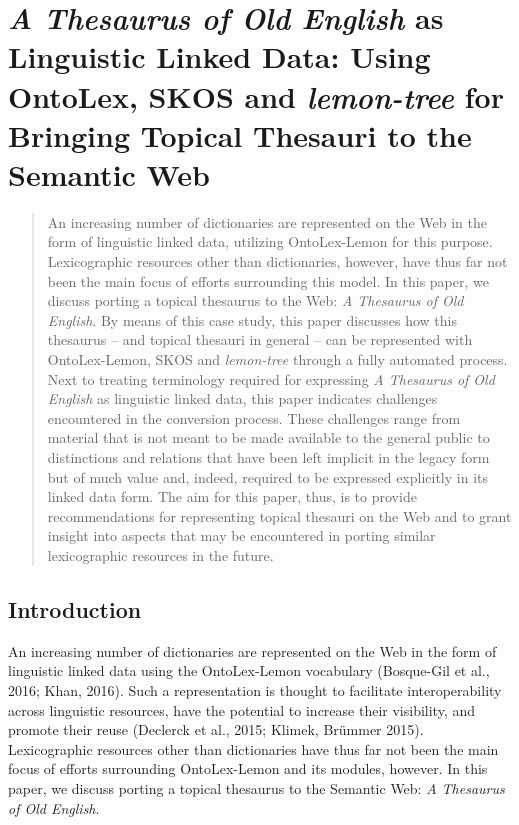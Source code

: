 

\chapter{\emph{A Thesaurus of Old English} as Linguistic Linked Data: Using OntoLex, SKOS and \emph{lemon-tree} for Bringing Topical Thesauri to the Semantic Web}

\begin{abstract}
An increasing number of dictionaries are represented on the Web in the form of linguistic linked data, utilizing OntoLex-Lemon for this purpose. Lexicographic resources other than dictionaries, however, have thus far not been the main focus of efforts surrounding this model. In this paper, we discuss porting a topical thesaurus to the Web: \textit{A Thesaurus of Old English}. By means of this case study, this paper discusses how this thesaurus – and topical thesauri in general – can be represented with OntoLex-Lemon, SKOS and \textit{lemon-tree} through a fully automated process.
Next to treating terminology required for expressing \textit{A Thesaurus of Old English} as linguistic linked data, this paper indicates challenges encountered in the conversion process. These challenges range from material that is not meant to be made available to the general public to distinctions and relations that have been left implicit in the legacy form but of much value and, indeed, required to be expressed explicitly in its linked data form. The aim for this paper, thus, is to provide recommendations for representing topical thesauri on the Web and to grant insight into aspects that may be encountered in porting similar lexicographic resources in the future.
\end{abstract}

\section{Introduction}
An increasing number of dictionaries are represented on the Web in the form of linguistic linked data using the OntoLex-Lemon vocabulary (Bosque-Gil et al., 2016; Khan, 2016). Such a representation is thought to facilitate interoperability across linguistic resources, have the potential to increase their visibility, and promote their reuse (Declerck et al., 2015; Klimek, Brümmer 2015). Lexicographic resources other than dictionaries have thus far not been the main focus of efforts surrounding OntoLex-Lemon and its modules, however. In this paper, we discuss porting a topical thesaurus to the Semantic Web: \textit{A Thesaurus of Old English}. 

